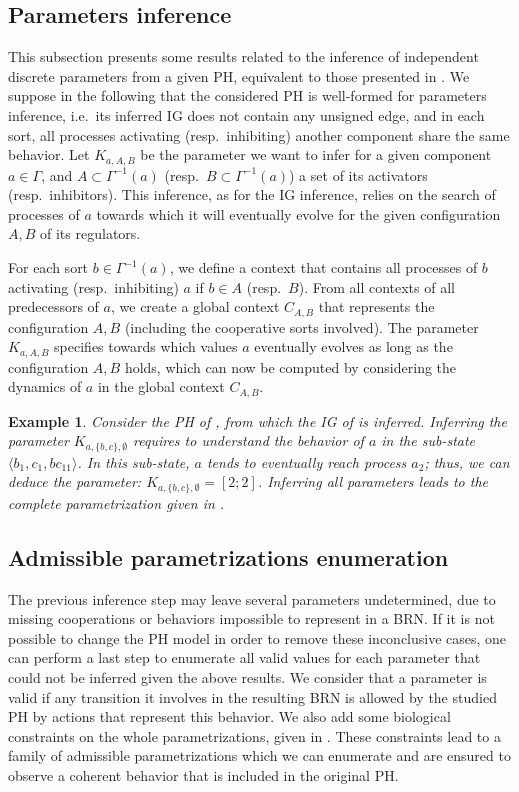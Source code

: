 \documentclass[11pt,a4paper,twoside]{epig}
\def\pref{\prettyref}
\newtheorem{example}{Example}{\itshape}{}
\def\PHstate#1{\langle #1 \rangle}
\newcommand{\GRNreg}[1]{\Gamma^{-1}(#1)}
\newcounter{la}
\newcommand{\ie}{i.e.\ }
\newcommand{\resp}{resp.\ }
\begin{document}
%
\subsection{Parameters inference}\label{ssec:infer-K}
This subsection presents some results related to the inference of independent discrete parameters from a given PH,
equivalent to those presented in \cite{PMR10-TCSB}.
We suppose in the following that the considered PH is well-formed for parameters inference, \ie its inferred IG does not contain any unsigned edge,
and in each sort, all processes activating (\resp inhibiting) another component share the same behavior.
Let $K_{a,A,B}$ be the parameter we want to infer for a given component $a \in \Gamma$,
and $A \subset \GRNreg{a}$ (\resp $B \subset \GRNreg{a}$) a set of its activators (\resp inhibitors).
This inference, as for the IG inference, relies on the search of processes of $a$ towards which it will eventually evolve for the given configuration $A,B$ of its regulators.

For each sort $b \in \GRNreg{a}$, we define a context that contains all processes of $b$ activating (\resp inhibiting) $a$ if $b \in A$ (\resp $B$).
From all contexts of all predecessors of $a$, we create a global context $C_{A,B}$ that represents the configuration $A,B$ (including the cooperative sorts involved).
The parameter $K_{a,A,B}$ specifies towards which values $a$ eventually evolves as long as the configuration $A,B$ holds, which can now be computed by considering the dynamics of $a$ in the global context $C_{A,B}$.

\begin{example}
Consider the PH of \pref{fig:runningPH}, from which the IG of \pref{fig:runningBRN} is inferred.
Inferring the parameter $K_{a,\{b,c\},\emptyset}$ requires to understand the behavior of $a$ in the sub-state $\PHstate{b_1, c_1, bc_{11}}$.
In this sub-state, $a$ tends to eventually reach process $a_2$; thus, we can deduce the parameter: $K_{a,\{b,c\},\emptyset} = [2 ; 2]$.
Inferring all parameters leads to the complete parametrization given in \pref{fig:runningBRN}.
\end{example}

\subsection{Admissible parametrizations enumeration}\label{ssec:admissible-K}
The previous inference step may leave several parameters undetermined, due to missing cooperations or behaviors impossible to represent in a BRN.
If it is not possible to change the PH model in order to remove these inconclusive cases,
one can perform a last step to enumerate all valid values for each parameter that could not be inferred given the above results.
We consider that a parameter is valid if any transition it involves in the resulting BRN is allowed by the studied PH by actions that represent this behavior.
We also add some biological constraints on the whole parametrizations, given in \cite{BernotSemBRN}.
These constraints lead to a family of admissible parametrizations which we can enumerate and are ensured to observe a coherent behavior that is included in the original PH.
\end{document}
